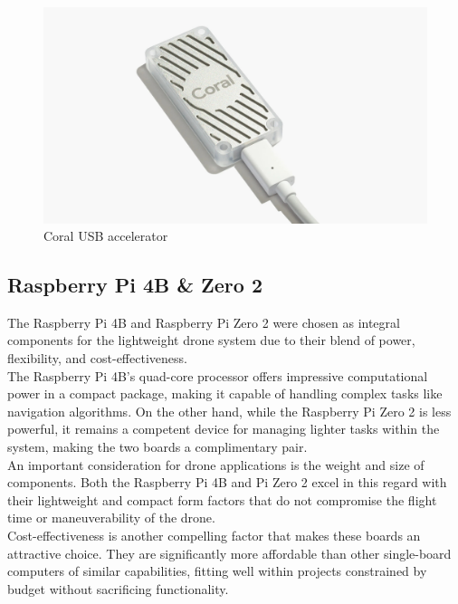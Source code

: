 \begin{figure}[h]
    \centering
    \includegraphics[scale=0.1]{fig/Coral TPU.jpg}
    \caption{Coral USB accelerator \cite{CoralTPU_bilde}}
\end{figure}


\subsection{Raspberry Pi 4B \& Zero 2}

The Raspberry Pi 4B and Raspberry Pi Zero 2 were chosen as integral components for the lightweight drone system due to their blend of power, flexibility, and cost-effectiveness.\\

The Raspberry Pi 4B's quad-core processor offers impressive computational power in a compact package, making it capable of handling complex tasks like navigation algorithms. On the other hand, while the Raspberry Pi Zero 2 is less powerful, it remains a competent device for managing lighter tasks within the system, making the two boards a complimentary pair.\\

An important consideration for drone applications is the weight and size of components. Both the Raspberry Pi 4B and Pi Zero 2 excel in this regard with their lightweight and compact form factors that do not compromise the flight time or maneuverability of the drone.\\

Cost-effectiveness is another compelling factor that makes these boards an attractive choice. They are significantly more affordable than other single-board computers of similar capabilities, fitting well within projects constrained by budget without sacrificing functionality.\\

